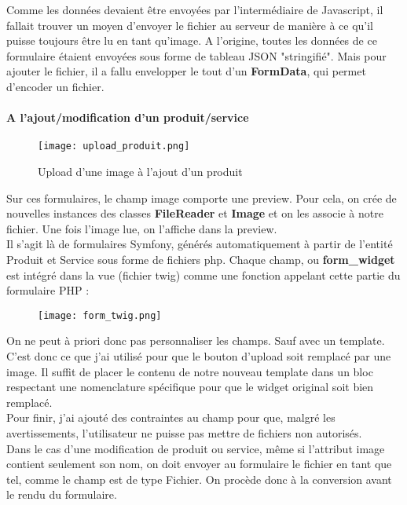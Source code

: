 Comme les données devaient être envoyées par l'intermédiaire de Javascript, il fallait trouver un moyen d'envoyer le fichier au serveur de manière à ce qu'il puisse toujours être lu en tant qu'image.
A l'origine, toutes les données de ce formulaire étaient envoyées sous forme de tableau JSON "stringifié". Mais pour ajouter le fichier, il a fallu envelopper le tout d'un \textbf{FormData}, qui permet d'encoder un fichier.

\paragraph*{A l'ajout/modification d'un produit/service}

\begin{figure}[H]
    \texttt{[image: upload\_produit.png]}
    \caption{Upload d'une image à l'ajout d'un produit}
\end{figure}

Sur ces formulaires, le champ image comporte une preview.
Pour cela, on crée de nouvelles instances des classes \textbf{FileReader} et \textbf{Image} et on les associe à notre fichier. 
Une fois l'image lue, on l'affiche dans la preview.\\

Il s'agit là de formulaires Symfony, générés automatiquement à partir de l'entité Produit et Service sous forme de fichiers php.
Chaque champ, ou \textbf{form\_widget} est intégré dans la vue (fichier twig) comme une fonction appelant cette partie du formulaire PHP :

\begin{figure}[H]
    \texttt{[image: form\_twig.png]}
\end{figure}

On ne peut à priori donc pas personnaliser les champs. Sauf avec un template. C'est donc ce que j'ai utilisé pour que le bouton d'upload soit remplacé par une image.
Il suffit de placer le contenu de notre nouveau template dans un bloc respectant une nomenclature spécifique pour que le widget original soit bien remplacé.\\

Pour finir, j'ai ajouté des contraintes au champ pour que, malgré les avertissements, l'utilisateur ne puisse pas mettre de fichiers non autorisés.\\

Dans le cas d'une modification de produit ou service, même si l'attribut image contient seulement son nom, on doit envoyer au formulaire le fichier en tant que tel, comme le champ est de type Fichier. 
On procède donc à la conversion avant le rendu du formulaire. 

